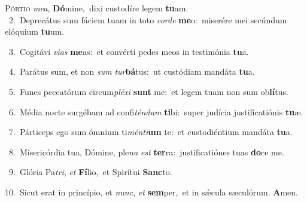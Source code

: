 \lettrine{\initial\textcolor{\initialcolor}{P}}{órtio} \textit{me}\-\textit{a}, \textbf{Dó}\-mine,~\star dixi custodíre legem \textbf{tu}\-am.\\
{\numbfont\textcolor{\numbcolor}{~2.}}~Deprecátus sum fáciem tuam in toto \textit{cor}\-\textit{de} \textbf{me}\-o:~\star miserére mei secúndum elóquium \textbf{tu}\-um.\par
{\numbfont\textcolor{\numbcolor}{~3.}}~Cogitávi \textit{vi}\-\textit{as} \textbf{me}\-as:~\star et convérti pedes meos in testimónia \textbf{tu}\-a.\par
{\numbfont\textcolor{\numbcolor}{~4.}}~Parátus sum, et non \textit{sum} \textit{tur}\-\textbf{bá}tus:~\star ut custódiam mandáta \textbf{tu}\-a.\par
{\numbfont\textcolor{\numbcolor}{~5.}}~Funes peccatórum circum\-\textit{plé}\-\textit{xi} \textbf{sunt} me:~\star et legem tuam non sum ob\-\textbf{lí}\-tus.\par
{\numbfont\textcolor{\numbcolor}{~6.}}~Média nocte surgébam ad confi\-\textit{tén}\-\textit{dum} \textbf{ti}\-bi:~\star super judícia justificatiónis \textbf{tu}\-æ.\par
{\numbfont\textcolor{\numbcolor}{~7.}}~Párticeps ego sum ómnium ti\-\textit{mén}\-\textit{ti}\textbf{um} te:~\star et custodiéntium mandáta \textbf{tu}\-a.\par
{\numbfont\textcolor{\numbcolor}{~8.}}~Misericórdia tua, Dómine, ple\textit{na} \textit{est} \textbf{ter}\-ra:~\star justificatiónes tuas \textbf{do}\-ce me.\par
{\numbfont\textcolor{\numbcolor}{~9.}}~Glória Pa\-\textit{tri}\-, \textit{et} \textbf{Fí}\-lio,~\star et Spirítui \textbf{Sanc}\-to.\par
{\numbfont\textcolor{\numbcolor}{10.}}~Sicut erat in princípio, et \textit{nunc}\-, \textit{et} \textbf{sem}\-per,~\star et in sǽcula sæculórum. \textbf{A}\-men.\par
